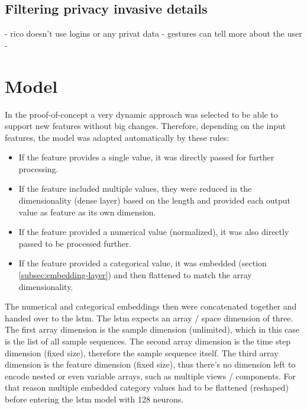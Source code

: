 \subsection{Filtering privacy invasive details}

- rico doesn't use logins or any privat data
- gestures can tell more about the user
-

\section{Model}

In the proof-of-concept a very dynamic approach was selected to be able to support new features without big changes.
Therefore, depending on the input features, the model was adapted automatically by these rules:

\begin{itemize}
  \item If the feature provides a single value, it was directly passed for further processing.
  \item If the feature included multiple values, they were reduced in the dimensionality (dense layer) based on the length and provided each output value as feature as its own dimension.
  \item If the feature provided a numerical value (normalized), it was also directly passed to be processed further.
  \item If the feature provided a categorical value, it was embedded (section \ref{subsec:embedding-layer}) and then flattened to match the array dimensionality.
\end{itemize}

The numerical and categorical embeddings then were concatenated together and handed over to the \gls{lstm}.
The \gls{lstm} expects an array / space dimension of three.
The first array dimension is the sample dimension (unlimited), which in this case is the list of all sample sequences.
The second array dimension is the time step dimension (fixed size), therefore the sample sequence itself.
The third array dimension is the feature dimension (fixed size), thus there's no dimension left to encode nested or even variable arrays, such as multiple views / components.
For that reason multiple embedded category values had to be flattened (reshaped) before entering the \gls{lstm} model with 128 neurons.

